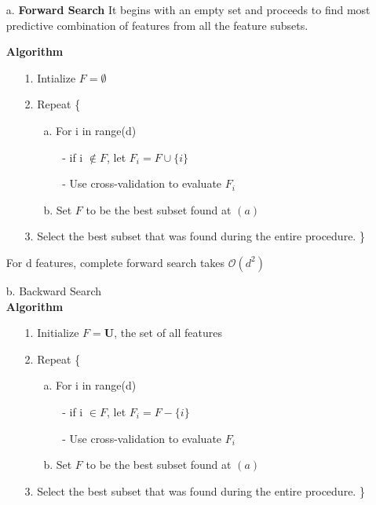 \documentclass[12pt,a4paper,titlepage,portrait,openany]{book}
\begin{document}
	\begin{enumerate}
		\item[a.] \textbf{Forward Search}
		It begins with an empty set and proceeds to find most predictive combination of features from all the feature subsets.
		
		\textbf{Algorithm}
		\begin{enumerate}
			\item[1.] Intialize $F = \emptyset$
			\item[2.] Repeat \{
			\begin{enumerate}
				\item[a.] For i in range(d)
				\begin{enumerate}
					\item[-] if i $\notin F$, let $F_i=F\cup\{i\}$
					\item[-] Use cross-validation to evaluate $F_i$
				\end{enumerate}
				\item[b.] Set $F$ to be the best subset found at $(a)$
			\end{enumerate}
			\item[3.] Select the best subset that was found during the entire procedure.
		\} 
		\end{enumerate}
	For d features, complete forward search takes $\mathcal{O}(d^2)$\\
		\item[b.] Backward Search \\
		\textbf{Algorithm}
		\begin{enumerate}
			\item[1.] Initialize $F = \mathbf{U} $, the set of all features
			\item[2.] Repeat \{
			\begin{enumerate}
				\item[a.] For i in range(d)
				\begin{enumerate}
					\item[-] if i $\in F$, let $F_i=F - \{i\}$
					\item[-] Use cross-validation to evaluate $F_i$
				\end{enumerate}
				\item[b.] Set $F$ to be the best subset found at $(a)$
			\end{enumerate}
			\item[3.] Select the best subset that was found during the entire procedure.
			\}
		\end{enumerate}
	\end{enumerate}
\end{document}
